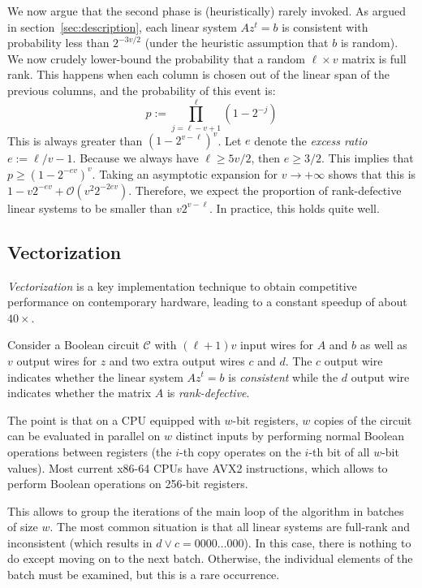 \documentclass[a4paper,UKenglish,cleveref, autoref]{lipics-v2019}
\newcommand{\bigO}[1]{\ensuremath{\mathcal{O}\left( #1 \right)} }
\begin{document}
We now argue that the second phase is (heuristically) rarely invoked.  As argued
in section~\ref{sec:description}, each linear system $Az^t = b$ is consistent
with probability less than $2^{-3v/2}$ (under the heuristic assumption that $b$
is random). We now crudely lower-bound the probability that a random
$\ell \times v$ matrix is full rank. This happens when each column is chosen out
of the linear span of the previous columns, and the probability of this event
is:
\[
p := \prod_{j=\ell-v+1}^\ell \left(1 - 2^{-j} \right)
\]
This is always greater than $\left(1 - 2^{v-\ell} \right)^v$. Let $e$ denote the
\emph{excess ratio} $e := \ell/v - 1$. Because we always have $\ell \geq 5v/2$,
then $e \geq 3/2$. This implies that $p \geq \left(1 - 2^{-ev} \right)^v$. Taking
an asymptotic expansion for $v \rightarrow +\infty$ shows that this is
$1 - v 2^{-ev} + \bigO{v^2 2^{-2ev}}$. Therefore, we expect the proportion of
rank-defective linear systems to be smaller than $v 2^{v-\ell}$. In practice,
this holds quite well.

\subsection{Vectorization}

\emph{Vectorization} is a key implementation technique to obtain competitive
performance on contemporary hardware, leading to a constant speedup of about
$40 \times$.

Consider a Boolean circuit $\mathcal{C}$ with $(\ell+1)v$ input wires for $A$
and $b$ as well as $v$ output wires for $z$ and two extra output wires $c$ and
$d$. The $c$ output wire indicates whether the linear system $A z^t = b$ is
\emph{consistent} while the $d$ output wire indicates whether the matrix $A$ is
\emph{rank-defective}.

The point is that on a CPU equipped with $w$-bit registers, $w$ copies of the
circuit can be evaluated in parallel on $w$ distinct inputs by performing normal
Boolean operations between registers (the $i$-th copy operates on the $i$-th bit
of all $w$-bit values). Most current \textsf{x86-64} CPUs have \textsf{AVX2}
instructions, which allows to perform Boolean operations on 256-bit registers.

This allows to group the iterations of the main loop of the algorithm in batches
of size $w$. The most common situation is that all linear systems are full-rank
and inconsistent (which results in $d \vee c = 0000 \dots 000$). In this case,
there is nothing to do except moving on to the next batch. Otherwise, the
individual elements of the batch must be examined, but this is a rare occurrence.
\end{document}
